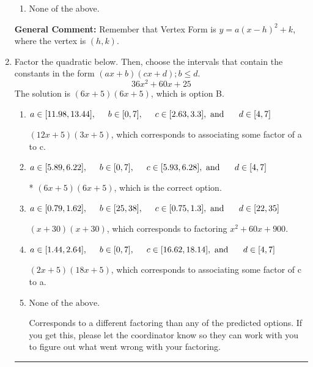 \documentclass{extbook}[14pt]
\newcommand{\litem}[1]{\item #1

\rule{\textwidth}{0.4pt}}
\begin{document}
\begin{enumerate}
{\begin{enumerate}[label=\Alph*.]
\begin{multicols}{2}
\end{multicols}\item None of the above.\end{enumerate}
\textbf{General Comment:} Remember that Vertex Form is $y = a(x-h)^2+k$, where the vertex is $(h, k)$.
}
\litem{
Factor the quadratic below. Then, choose the intervals that contain the constants in the form $(ax+b)(cx+d); b \leq d.$
\[ 36x^{2} +60 x + 25 \]The solution is \( (6x + 5)(6x + 5) \), which is option B.\begin{enumerate}[label=\Alph*.]
\item \( a \in [11.98, 13.44], \hspace*{5mm} b \in [0, 7], \hspace*{5mm} c \in [2.63, 3.3], \text{ and } \hspace*{5mm} d \in [4, 7] \)

 $(12x + 5)(3x + 5)$, which corresponds to associating some factor of a to c.
\item \( a \in [5.89, 6.22], \hspace*{5mm} b \in [0, 7], \hspace*{5mm} c \in [5.93, 6.28], \text{ and } \hspace*{5mm} d \in [4, 7] \)

* $(6x + 5)(6x + 5)$, which is the correct option.
\item \( a \in [0.79, 1.62], \hspace*{5mm} b \in [25, 38], \hspace*{5mm} c \in [0.75, 1.3], \text{ and } \hspace*{5mm} d \in [22, 35] \)

 $(x + 30)(x + 30)$, which corresponds to factoring $x^{2} +60 x + 900$.
\item \( a \in [1.44, 2.64], \hspace*{5mm} b \in [0, 7], \hspace*{5mm} c \in [16.62, 18.14], \text{ and } \hspace*{5mm} d \in [4, 7] \)

 $(2x + 5)(18x + 5)$, which corresponds to associating some factor of c to a.
\item \( \text{None of the above.} \)

 Corresponds to a different factoring than any of the predicted options. If you get this, please let the coordinator know so they can work with you to figure out what went wrong with your factoring.
\end{enumerate}

}
\end{enumerate}
\end{document}
